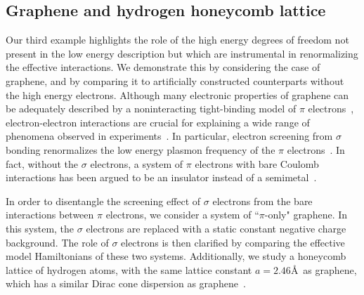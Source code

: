 \subsection{Graphene and hydrogen honeycomb lattice}
\label{subsection:graphene}
Our third example highlights the role of the high energy 
degrees of freedom not present in the low energy description 
but which are instrumental in renormalizing the effective interactions. 
We demonstrate this by considering the case of graphene, and by 
comparing it to artificially constructed counterparts without the high energy electrons. 
Although many electronic properties of graphene can be adequately 
described by a noninteracting tight-binding model of $\pi$ electrons~\cite{Castro2009}, 
electron-electron interactions are crucial for explaining 
a wide range of phenomena observed in experiments~\cite{Kotov2012}. 
In particular, electron screening from $\sigma$ bonding renormalizes 
the low energy plasmon frequency of the $\pi$ electrons~\cite{Zheng2016}. In fact, 
without the $\sigma$ electrons, a system of $\pi$ electrons with bare Coulomb interactions has been argued to be an 
insulator instead of a semimetal~\cite{DrutPRL2009, DrutPRB2009,  Smith2014, Zheng2016}. 

In order to disentangle the screening effect of $\sigma$ electrons from the bare interactions 
between $\pi$ electrons, we consider a system of ``$\pi$-only" graphene. In this system, the 
$\sigma$ electrons are replaced with a static constant negative charge background. 
The role of $\sigma$ electrons is then clarified by comparing the effective model Hamiltonians of these two systems. 
Additionally, we study a honeycomb lattice of hydrogen atoms, with the same lattice constant $a=2.46$\AA~as graphene, 
which has a similar Dirac cone dispersion as graphene~\cite{Zheng2016}. 

